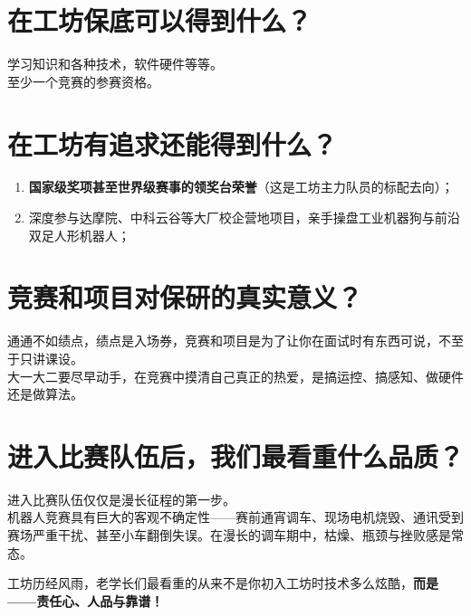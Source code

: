 \documentclass[a4paper,11pt,oneside]{scrreprt}
\begin{document}
\section*{在工坊保底可以得到什么？}
{}

学习知识和各种技术，软件硬件等等。\\
至少一个竞赛的参赛资格。

\section*{在工坊有追求还能得到什么？}
{}

\begin{enumerate}
    \item \textbf{国家级奖项甚至世界级赛事的领奖台荣誉}（这是工坊主力队员的标配去向）；
    \item 深度参与达摩院、中科云谷等大厂校企营地项目，亲手操盘工业机器狗与前沿双足人形机器人；
\end{enumerate}

\section*{竞赛和项目对保研的真实意义？}
{}

\begin{ctbox}
通通不如绩点，绩点是入场券，竞赛和项目是为了让你在面试时有东西可说，不至于只讲课设。\\
大一大二要尽早动手，在竞赛中摸清自己真正的热爱，是搞运控、搞感知、做硬件还是做算法。
\end{ctbox}

\section*{进入比赛队伍后，我们最看重什么品质？}
{}

进入比赛队伍仅仅是漫长征程的第一步。\\
机器人竞赛具有巨大的客观不确定性——赛前通宵调车、现场电机烧毁、通讯受到赛场严重干扰、甚至小车翻倒失误。在漫长的调车期中，枯燥、瓶颈与挫败感是常态。

工坊历经风雨，老学长们最看重的从来不是你初入工坊时技术多么炫酷，\textbf{而是——责任心、人品与靠谱！}
\end{document}
